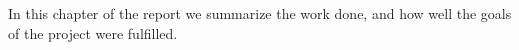 In this chapter of the report we summarize the work done, and how well
the goals of the project were fulfilled.

